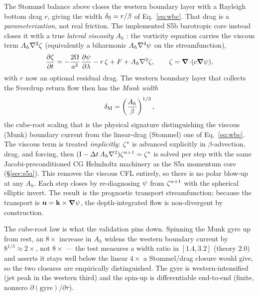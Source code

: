 The Stommel balance above closes the western boundary layer with a Rayleigh bottom drag $r$,
giving the width $\delta_{\mathrm{S}}=r/\beta$ of Eq.~\eqref{eq:wbc}. That drag is a \emph{parameterization},
not real friction. The implemented S5b barotropic core instead closes it with a true
\emph{lateral viscosity} $A_h$ \citep{munk1950}: the vorticity equation carries the viscous
term $A_h\nabla^{2}\zeta$ (equivalently a biharmonic $A_h\nabla^{4}\psi$ on the streamfunction),
\begin{equation}\label{eq:munk}
  \frac{\partial \zeta}{\partial t}=-\frac{2\Omega}{a^{2}}\,\frac{\partial \psi}{\partial \lambda}-r\,\zeta+F+A_h\nabla^{2}\zeta,
  \qquad \zeta=\boldsymbol{\nabla}\!\cdot\!(c\boldsymbol{\nabla}\psi),
\end{equation}
with $r$ now an optional residual drag. The western boundary layer that collects the Sverdrup
return flow then has the \emph{Munk width}
\begin{equation}\label{eq:munk-width}
  \delta_{\mathrm M}=\left(\frac{A_h}{\beta}\right)^{1/3},
\end{equation}
the cube-root scaling that is the physical signature distinguishing the viscous (Munk)
boundary current from the linear-drag (Stommel) one of Eq.~\eqref{eq:wbc}. The viscous term is
treated \emph{implicitly}: $\zeta^{*}$ is advanced explicitly in $\beta$-advection, drag, and
forcing, then $(\mathrm I-\Delta t\,A_h\nabla^{2})\zeta^{n+1}=\zeta^{*}$ is solved per step with the
same Jacobi-preconditioned CG Helmholtz machinery as the S5a momentum core
(\S\ref{sec:s5a}). This removes the viscous CFL entirely, so there is no polar blow-up at any
$A_h$. Each step closes by re-diagnosing $\psi$ from $\zeta^{n+1}$ with the spherical elliptic
invert. The result is the prognostic transport streamfunction; because the transport is
$\mathbf{u}=\mathbf{k}\times\boldsymbol{\nabla}\psi$, the depth-integrated flow is non-divergent by construction.

The cube-root law is what the validation pins down. Spinning the Munk gyre up from rest, an
$8\times$ increase in $A_h$ widens the western boundary current by $8^{1/3}\approx2\times$, not
$8\times$ --- the test measures a width ratio in $[1.4,3.2]$ (theory $2.0$) and asserts it stays
well below the linear $4\times$ a Stommel/drag closure would give, so the two closures are
empirically distinguished. The gyre is western-intensified (jet peak in the western third) and
the spin-up is differentiable end-to-end (finite, nonzero $\partial(\text{gyre})/\partial\tau$).

